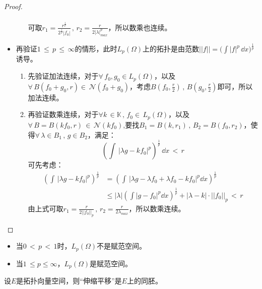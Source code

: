 \begin{proof}
\begin{itemize}
\begin{enumerate}
\begin{equation*}
\begin{aligned}
				\end{aligned}
			\end{equation*}
		可取$r_{1}=\frac{r^{\frac{1}{p}}}{2^{\frac{1}{p}}|f_{0}|}\, ,\, r_{2}=\frac{r}{2|\lambda|^{p}_{max}}$，所以数乘也连续。
		\end{enumerate}
	\item 再验证$1\, \leq \, p \, \leq \, \infty $的情形，此时$L_{p}(\Omega)$上的拓扑是由范数$||f||=\Big(\int |f|^{p}\,\dd x\Big)^{\frac{1}{p}}$诱导。
	\begin{enumerate}
		\item 先验证加法连续，对于$\forall \, f_{0},g_{0}\in L_{p}(\Omega)$，以及$\forall \, B(f_{0}+g_{0},r)\in \, \mathcal{N}(f_{0}+g_{0})$，考虑$B(f_{0},\frac{r}{2})\, , \, B(g_{0},\frac{r}{2})$即可，所以加法连续。
		\item 再验证数乘连续，对于$\forall k\, \in \mathbb{K}\, , \, f_{0}\in \, L_{p}(\Omega)$，以及$\forall \, B=B(kf_{0},r)\, \in \, \mathcal{N}(kf_{0})$,要找$B_{1}=B(k,r_{1})\, ,\, B_{2}=B(f_{0},r_{2})$，使得$\forall \, \lambda\in B_{1}\, ,\, g\in B_{2}$，满足：
		\begin{equation*}
			(\int \, |\lambda g-kf_{0}|^{p})^{\frac{1}{p}}\, \dd x \, <\, r
		\end{equation*}
	可先考虑：
	\begin{equation*}
		\begin{aligned}
				(\int \, |\lambda g-kf_{0}|^{p})^{\frac{1}{p}}&=(\int \, |\lambda g-\lambda f_{0}+\lambda f_{0}-kf_{0}|^{p}\dd x)^{\frac{1}{p}}\\
				&\leq |\lambda|(\int |g-f_{0}|^{p}\dd x)^{\frac{1}{p}}+|\lambda-k|\cdot||f_{0}||_{p}\, <\, r
		\end{aligned}
	\end{equation*}
	由上式可取$r_{1}=\frac{r}{2||f_{0}||_{p}}\,,\, r_{2}=\frac{r}{2\lambda_{max}}$，所以数乘连续。
	\end{enumerate}
	\end{itemize}
\end{proof}

\begin{remark}
	\begin{itemize}
		\item 当$0\, <\, p\, <\, 1$时，$L_{p}(\Omega)$不是赋范空间。
		\item 当$1\, \leq p \leq \infty$，$L_{p}(\Omega)$是赋范空间。
	\end{itemize}
\end{remark}

\begin{theorem}\label{XQHthe070101}
	设$E$是拓扑向量空间，则“伸缩平移”是$E$上的同胚。
\end{theorem}

